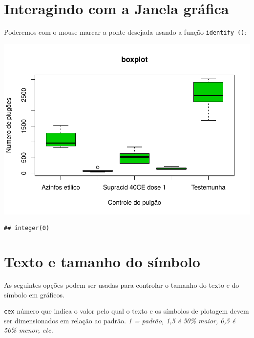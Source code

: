 \documentclass[
]{book}
\newenvironment{Shaded}{\begin{snugshade}}{\end{snugshade}}
\newcommand{\DataTypeTok}[1]{\textcolor[rgb]{0.13,0.29,0.53}{#1}}
\newcommand{\DecValTok}[1]{\textcolor[rgb]{0.00,0.00,0.81}{#1}}
\newcommand{\KeywordTok}[1]{\textcolor[rgb]{0.13,0.29,0.53}{\textbf{#1}}}
\newcommand{\NormalTok}[1]{#1}
\newcommand{\OperatorTok}[1]{\textcolor[rgb]{0.81,0.36,0.00}{\textbf{#1}}}
\begin{document}
\hypertarget{interagindo-com-a-janela-gruxe1fica}{%
\section{Interagindo com a Janela gráfica}\label{interagindo-com-a-janela-gruxe1fica}}

Poderemos com o mouse marcar a ponte desejada usando a função \texttt{identify\ ()}:

\begin{Shaded}
\end{Shaded}

\includegraphics{TudodoR_files/figure-latex/unnamed-chunk-179-1.pdf}

\begin{verbatim}
## integer(0)
\end{verbatim}

\hypertarget{texto-e-tamanho-do-suxedmbolo}{%
\section{Texto e tamanho do símbolo}\label{texto-e-tamanho-do-suxedmbolo}}

As seguintes opções podem ser usadas para controlar o tamanho do texto e do símbolo em gráficos.

\texttt{cex} número que indica o valor pelo qual o texto e os símbolos de plotagem devem ser dimensionados em relação ao padrão.
\emph{1 = padrão, 1,5 é 50\% maior, 0,5 é 50\% menor, etc.}
\end{document}
